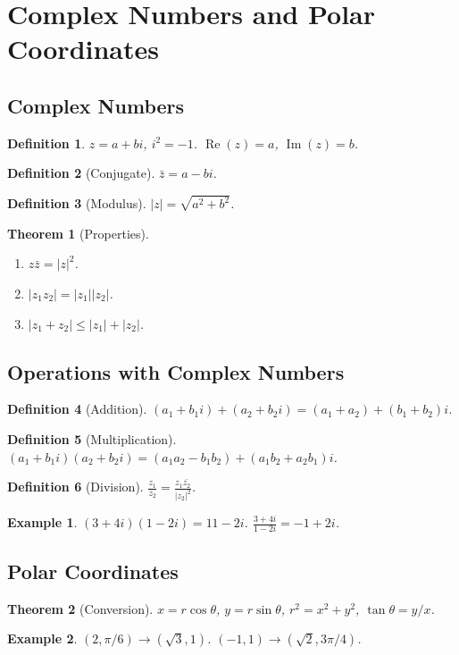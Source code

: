 \documentclass[11pt,a4paper]{article}
\newtheorem{example}{Example}
\newtheorem{theorem}{Theorem}
\newtheorem{definition}{Definition}
\begin{document}
\section{Complex Numbers and Polar Coordinates}
\subsection{Complex Numbers}
\begin{definition}
$z = a + bi$, $i^2 = -1$. $\operatorname{Re}(z) = a$, $\operatorname{Im}(z) = b$.
\end{definition}
\begin{definition}[Conjugate]
$\bar{z} = a - bi$.
\end{definition}
\begin{definition}[Modulus]
$|z| = \sqrt{a^2 + b^2}$.
\end{definition}
\begin{theorem}[Properties]
\begin{enumerate}
\item $z\bar{z} = |z|^2$.
\item $|z_1 z_2| = |z_1||z_2|$.
\item $|z_1 + z_2| \leq |z_1| + |z_2|$.
\end{enumerate}
\end{theorem}
\subsection{Operations with Complex Numbers}
\begin{definition}[Addition]
$(a_1+b_1 i) + (a_2+b_2 i) = (a_1+a_2) + (b_1+b_2)i$.
\end{definition}
\begin{definition}[Multiplication]
$(a_1+b_1 i)(a_2+b_2 i) = (a_1 a_2 - b_1 b_2) + (a_1 b_2 + a_2 b_1)i$.
\end{definition}
\begin{definition}[Division]
$\frac{z_1}{z_2} = \frac{z_1 \bar{z_2}}{|z_2|^2}$.
\end{definition}
\begin{example}
$(3+4i)(1-2i) = 11 - 2i$. $\frac{3+4i}{1-2i} = -1 + 2i$.
\end{example}
\subsection{Polar Coordinates}
\begin{theorem}[Conversion]
$x = r\cos\theta$, $y = r\sin\theta$, $r^2 = x^2+y^2$, $\tan\theta = y/x$.
\end{theorem}
\begin{example}
$(2, \pi/6) \to (\sqrt{3}, 1)$. $(-1,1) \to (\sqrt{2}, 3\pi/4)$.
\end{example}
\end{document}
